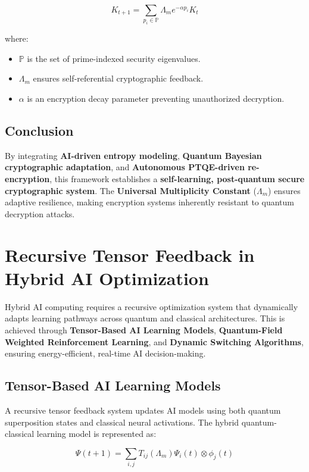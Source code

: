 \documentclass{article}
\theoremstyle{plain}
\begin{document}
\begin{equation}
    K_{t+1} = \sum_{p_i \in \mathbb{P}} \Lambda_m e^{-\alpha p_i} K_t
\end{equation}

where:
\begin{itemize}
    \item $\mathbb{P}$ is the set of prime-indexed security eigenvalues.
    \item $\Lambda_m$ ensures self-referential cryptographic feedback.
    \item $\alpha$ is an encryption decay parameter preventing unauthorized decryption.
\end{itemize}

\subsection{Conclusion}

By integrating \textbf{AI-driven entropy modeling}, \textbf{Quantum Bayesian cryptographic adaptation}, and \textbf{Autonomous PTQE-driven re-encryption}, this framework establishes a \textbf{self-learning, post-quantum secure cryptographic system}. The \textbf{Universal Multiplicity Constant} ($\Lambda_m$) ensures adaptive resilience, making encryption systems inherently resistant to quantum decryption attacks.

\section{Recursive Tensor Feedback in Hybrid AI Optimization}

Hybrid AI computing requires a recursive optimization system that dynamically adapts learning pathways across quantum and classical architectures. This is achieved through \textbf{Tensor-Based AI Learning Models}, \textbf{Quantum-Field Weighted Reinforcement Learning}, and \textbf{Dynamic Switching Algorithms}, ensuring energy-efficient, real-time AI decision-making.

\subsection{Tensor-Based AI Learning Models}

A recursive tensor feedback system updates AI models using both quantum superposition states and classical neural activations. The hybrid quantum-classical learning model is represented as:

\begin{equation}
    \Psi(t+1) = \sum_{i,j} T_{ij}(\Lambda_m) \Psi_i(t) \otimes \phi_j(t)
\end{equation}
\end{document}
